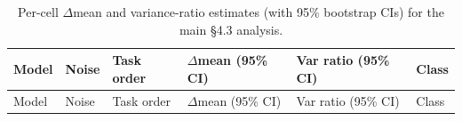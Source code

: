 \documentclass[
  10pt,
  letterpaper,
]{article}
\begin{document}
\begin{longtable}[]{@{}
  >{\raggedright\arraybackslash}p{}
  >{\raggedright\arraybackslash}p{}
  >{\raggedright\arraybackslash}p{}
  >{\raggedright\arraybackslash}p{}
  >{\raggedright\arraybackslash}p{}
  >{\raggedright\arraybackslash}p{}@{}}
\caption{Per-cell \(\Delta\)mean and variance-ratio estimates (with 95\%
bootstrap CIs) for the main §4.3
analysis.}\label{tbl-percell-deltas}\tabularnewline
\toprule\noalign{}
\begin{minipage}[b]{\linewidth}\raggedright
Model
\end{minipage} & \begin{minipage}[b]{\linewidth}\raggedright
Noise
\end{minipage} & \begin{minipage}[b]{\linewidth}\raggedright
Task order
\end{minipage} & \begin{minipage}[b]{\linewidth}\raggedright
\(\Delta\)mean (95\% CI)
\end{minipage} & \begin{minipage}[b]{\linewidth}\raggedright
Var ratio (95\% CI)
\end{minipage} & \begin{minipage}[b]{\linewidth}\raggedright
Class
\end{minipage} \\
\midrule\noalign{}
\endfirsthead
\toprule\noalign{}
\begin{minipage}[b]{\linewidth}\raggedright
Model
\end{minipage} & \begin{minipage}[b]{\linewidth}\raggedright
Noise
\end{minipage} & \begin{minipage}[b]{\linewidth}\raggedright
Task order
\end{minipage} & \begin{minipage}[b]{\linewidth}\raggedright
\(\Delta\)mean (95\% CI)
\end{minipage} & \begin{minipage}[b]{\linewidth}\raggedright
Var ratio (95\% CI)
\end{minipage} & \begin{minipage}[b]{\linewidth}\raggedright
Class
\end{minipage} \\

\end{longtable}
\end{document}
